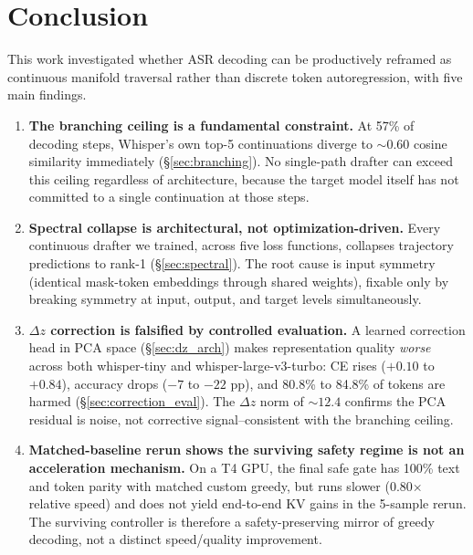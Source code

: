 \documentclass[11pt,a4paper]{article}
\begin{document}
\section{Conclusion}
\label{sec:conclusion}

This work investigated whether ASR decoding can be productively reframed as continuous manifold traversal rather than discrete token autoregression, with five main findings.

\begin{enumerate}[leftmargin=*,itemsep=4pt]
    \item \textbf{The branching ceiling is a fundamental constraint.}
    At 57\% of decoding steps, Whisper's own top-5 continuations diverge to ${\sim}0.60$ cosine similarity immediately (\S\ref{sec:branching}).
    No single-path drafter can exceed this ceiling regardless of architecture, because the target model itself has not committed to a single continuation at those steps.

    \item \textbf{Spectral collapse is architectural, not optimization-driven.}
    Every continuous drafter we trained, across five loss functions, collapses trajectory predictions to rank-1 (\S\ref{sec:spectral}).
    The root cause is input symmetry (identical mask-token embeddings through shared weights), fixable only by breaking symmetry at input, output, and target levels simultaneously.

    \item \textbf{$\Delta z$ correction is falsified by controlled evaluation.}
    A learned correction head in PCA space (\S\ref{sec:dz_arch}) makes representation quality \emph{worse} across both whisper-tiny and whisper-large-v3-turbo: CE rises ($+0.10$ to $+0.84$), accuracy drops ($-7$ to $-22$ pp), and 80.8\% to 84.8\% of tokens are harmed (\S\ref{sec:correction_eval}).
    The $\Delta z$ norm of ${\sim}12.4$ confirms the PCA residual is noise, not corrective signal--consistent with the branching ceiling.

    \item \textbf{Matched-baseline rerun shows the surviving safety regime is not an acceleration mechanism.}
    On a T4 GPU, the final safe gate has 100\% text and token parity with matched custom greedy, but runs slower (0.80$\times$ relative speed) and does not yield end-to-end KV gains in the 5-sample rerun.
    The surviving controller is therefore a safety-preserving mirror of greedy decoding, not a distinct speed/quality improvement.


\end{enumerate}
\end{document}
